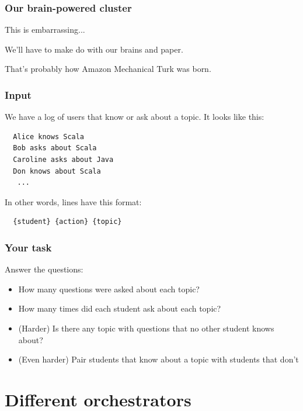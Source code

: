 \documentclass{beamer}
\begin{document}
\begin{frame}
  \frametitle{Our brain-powered cluster}

  \center
  {\huge This is embarrassing...}

  \pause
  
  {\huge We'll have to make do with our brains and paper.}

  \pause
  
  {\huge That's probably how Amazon Mechanical Turk was born.}

\end{frame}

\begin{frame}[fragile]
  \frametitle{Input}
  
We have a log of users that know or ask about a topic.
It looks like this:

\begin{verbatim}
  Alice knows Scala
  Bob asks about Scala
  Caroline asks about Java
  Don knows about Scala
   ...
\end{verbatim}

In other words, lines have this format:

\begin{verbatim}
  {student} {action} {topic}
\end{verbatim}

\end{frame}

\begin{frame}
  \frametitle{Your task}

  Answer the questions:
\begin{itemize}
  \item How many questions were asked about each topic?
    \pause
  \item How many times did each student ask about each topic?
    \pause
  \item (Harder) Is there any topic with questions that no other student knows about?
    \pause
  \item (Even harder) Pair students that know about a topic with students that don't

\end{itemize}
  
\end{frame}

\section{Different orchestrators}
\end{document}
